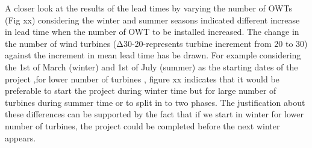 A closer look at the results of the lead times by varying the number of OWTs (Fig xx) considering the winter and summer seasons indicated different increase in lead time when the number of OWT to be installed increased. The change in the number of wind turbines (Δ30-20-represents turbine increment from 20 to 30) against the increment in mean lead time has be drawn. For example considering the 1st of March (winter) and 1st of July (summer) as the starting dates of the project ,for lower number of turbines , figure xx indicates that it would be preferable to start the project during winter time but for large number of turbines during summer time or to split in to two phases. The justification about these differences can be supported by the fact that if we start in winter for lower number of turbines, the project could be completed before the next winter appears. 